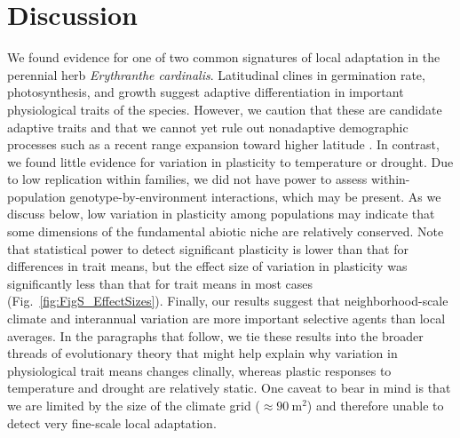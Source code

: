 \documentclass[11pt, oneside]{article}
\begin{document}
\section*{Discussion}

We found evidence for one of two common signatures of local adaptation in the perennial herb \textit{Erythranthe cardinalis}. Latitudinal clines in germination rate, photosynthesis, and growth suggest adaptive differentiation in important physiological traits of the species. However, we caution that these are candidate adaptive traits and that we cannot yet rule out nonadaptive demographic processes such as a recent range expansion toward higher latitude \citep{Paul_etal_2016, Sheth_Angert_2017}. In contrast, we found little evidence for variation in plasticity to temperature or drought. Due to low replication within families, we did not have power to assess within-population genotype-by-environment interactions, which may be present. As we discuss below, low variation in plasticity among populations may indicate that some dimensions of the fundamental abiotic niche are relatively conserved. Note that statistical power to detect significant plasticity is lower than that for differences in trait means, but the effect size of variation in plasticity was significantly less than that for trait means in most cases (Fig.~\ref{fig:FigS_EffectSizes}). Finally, our results suggest that neighborhood-scale climate and interannual variation are more important selective agents than local averages. In the paragraphs that follow, we tie these results into the broader threads of evolutionary theory that might help explain why variation in physiological trait means changes clinally, whereas plastic responses to temperature and drought are relatively static. One caveat to bear in mind is that we are limited by the size of the climate grid ($\approx 90~\text{m}^2$) and therefore unable to detect very fine-scale local adaptation.
\end{document}
